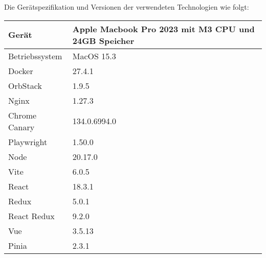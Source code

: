 Die Gerätspezifikation und Versionen der verwendeten Technologien wie folgt:

\begin{center}
  \begin{tabular}{ | m{5cm}| m{5cm} | } 
    \hline
    Gerät & Apple Macbook Pro 2023 mit M3 CPU und 24GB Speicher \\ 
    \hline
    Betriebssystem & MacOS 15.3 \\ 
    \hline
    Docker & 27.4.1 \\ 
    \hline
    OrbStack & 1.9.5 \\ 
    \hline
    Nginx & 1.27.3 \\ 
    \hline
    Chrome Canary & 134.0.6994.0 \\ 
    \hline
    Playwright & 1.50.0 \\ 
    \hline
    Node & 20.17.0 \\ 
    \hline
    Vite & 6.0.5 \\ 
    \hline
    React & 18.3.1 \\ 
    \hline
    Redux & 5.0.1 \\ 
    \hline
    React Redux & 9.2.0 \\ 
    \hline
    Vue & 3.5.13 \\ 
    \hline
    Pinia & 2.3.1 \\ 
    \hline
  \end{tabular}
\end{center}
